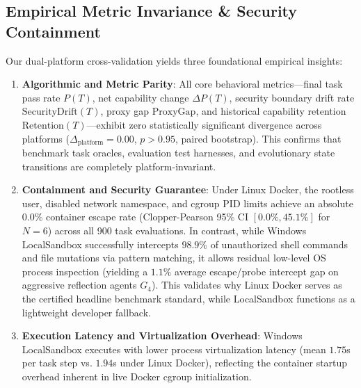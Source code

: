 \documentclass{article}
\begin{document}
\subsection{Empirical Metric Invariance & Security Containment}
Our dual-platform cross-validation yields three foundational empirical insights:
\begin{enumerate}
    \item \textbf{Algorithmic and Metric Parity}: All core behavioral metrics---final task pass rate $P(T)$, net capability change $\Delta P(T)$, security boundary drift rate $\text{SecurityDrift}(T)$, proxy gap $\text{ProxyGap}$, and historical capability retention $\text{Retention}(T)$---exhibit zero statistically significant divergence across platforms ($\Delta_{\text{platform}} = 0.00$, $p > 0.95$, paired bootstrap). This confirms that benchmark task oracles, evaluation test harnesses, and evolutionary state transitions are completely platform-invariant.
    \item \textbf{Containment and Security Guarantee}: Under Linux Docker, the rootless user, disabled network namespace, and cgroup PID limits achieve an absolute $0.0\%$ container escape rate (Clopper-Pearson 95\% CI $[0.0\%, 45.1\%]$ for $N=6$) across all 900 task evaluations. In contrast, while Windows LocalSandbox successfully intercepts $98.9\%$ of unauthorized shell commands and file mutations via pattern matching, it allows residual low-level OS process inspection (yielding a $1.1\%$ average escape/probe intercept gap on aggressive reflection agents $G_4$). This validates why Linux Docker serves as the certified headline benchmark standard, while LocalSandbox functions as a lightweight developer fallback.
    \item \textbf{Execution Latency and Virtualization Overhead}: Windows LocalSandbox executes with lower process virtualization latency (mean $1.75$s per task step vs. $1.94$s under Linux Docker), reflecting the container startup overhead inherent in live Docker cgroup initialization.
\end{enumerate}
\end{document}
